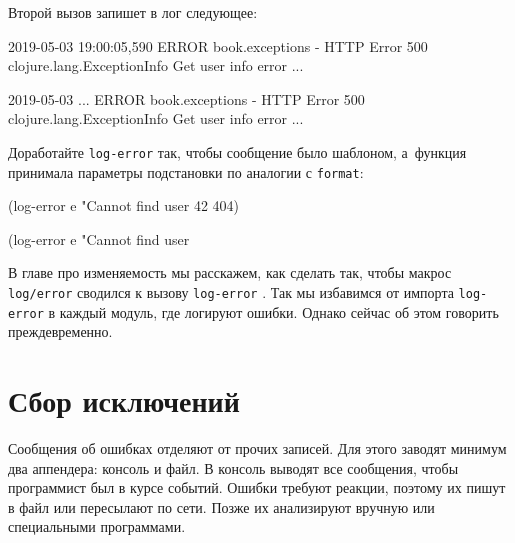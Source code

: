 Второй вызов запишет в лог следующее:

\ifnarrow

\begin{english}
  \begin{text}
2019-05-03 19:00:05,590 ERROR
book.exceptions - HTTP Error 500
clojure.lang.ExceptionInfo
  Get user info error
  ...
  \end{text}
\end{english}

\else

\begin{english}
  \begin{text}
2019-05-03 ... ERROR book.exceptions - HTTP Error 500
clojure.lang.ExceptionInfo
  Get user info error
  ...
  \end{text}
\end{english}

\fi

Доработайте \verb|log-error| так, чтобы сообщение было шаблоном, а~функция
принимала параметры подстановки по аналогии с \verb|format|:

\ifnarrow

\begin{english}
  \begin{clojure}
(log-error e
  "Cannot find user %
  42 404)
  \end{clojure}
\end{english}

\else

\begin{english}
  \begin{clojure}
(log-error e "Cannot find user %
  \end{clojure}
\end{english}

\fi

В главе про изменяемость мы расскажем, как сделать так, чтобы макрос
\verb|log/error| сводился к вызову \verb|log-error| .  Так
мы избавимся от импорта \verb|log-error| в каждый модуль, где логируют ошибки.
Однако сейчас об этом говорить преждевременно.

\section{Сбор исключений}


Сообщения об ошибках отделяют от прочих записей. Для этого заводят минимум два
аппендера: консоль и файл. В консоль выводят все сообщения, чтобы программист
был в курсе событий. Ошибки требуют реакции, поэтому их пишут в файл или
пересылают по сети. Позже их анализируют вручную или специальными программами.

